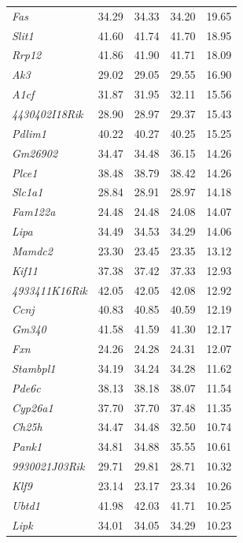 \documentclass{article}
\begin{document}
\begin{table}[ht]
\begin{tabular}{>{\em}lrrrr}
  Fas & 34.29 & 34.33 & 34.20 & 19.65 \\ 
  Slit1 & 41.60 & 41.74 & 41.70 & 18.95 \\ 
  Rrp12 & 41.86 & 41.90 & 41.71 & 18.09 \\ 
  Ak3 & 29.02 & 29.05 & 29.55 & 16.90 \\ 
  A1cf & 31.87 & 31.95 & 32.11 & 15.56 \\ 
  4430402I18Rik & 28.90 & 28.97 & 29.37 & 15.43 \\ 
  Pdlim1 & 40.22 & 40.27 & 40.25 & 15.25 \\ 
  Gm26902 & 34.47 & 34.48 & 36.15 & 14.26 \\ 
  Plce1 & 38.48 & 38.79 & 38.42 & 14.26 \\ 
  Slc1a1 & 28.84 & 28.91 & 28.97 & 14.18 \\ 
  Fam122a & 24.48 & 24.48 & 24.08 & 14.07 \\ 
  Lipa & 34.49 & 34.53 & 34.29 & 14.06 \\ 
  Mamdc2 & 23.30 & 23.45 & 23.35 & 13.12 \\ 
  Kif11 & 37.38 & 37.42 & 37.33 & 12.93 \\ 
  4933411K16Rik & 42.05 & 42.05 & 42.08 & 12.92 \\ 
  Ccnj & 40.83 & 40.85 & 40.59 & 12.19 \\ 
  Gm340 & 41.58 & 41.59 & 41.30 & 12.17 \\ 
  Fxn & 24.26 & 24.28 & 24.31 & 12.07 \\ 
  Stambpl1 & 34.19 & 34.24 & 34.28 & 11.62 \\ 
  Pde6c & 38.13 & 38.18 & 38.07 & 11.54 \\ 
  Cyp26a1 & 37.70 & 37.70 & 37.48 & 11.35 \\ 
  Ch25h & 34.47 & 34.48 & 32.50 & 10.74 \\ 
  Pank1 & 34.81 & 34.88 & 35.55 & 10.61 \\ 
  9930021J03Rik & 29.71 & 29.81 & 28.71 & 10.32 \\ 
  Klf9 & 23.14 & 23.17 & 23.34 & 10.26 \\ 
  Ubtd1 & 41.98 & 42.03 & 41.71 & 10.25 \\ 
  Lipk & 34.01 & 34.05 & 34.29 & 10.23 \\ 
   \hline 
\end{tabular}
\endgroup
\end{table}
\end{document}
